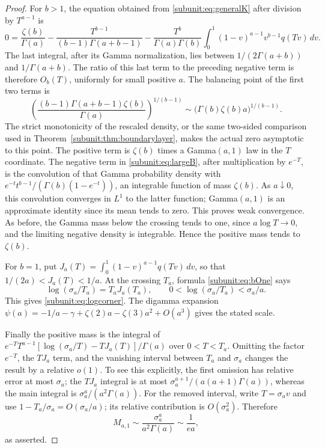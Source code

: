 \begin{proof}
For $b>1$, the equation obtained from
\eqref{subunit:eq:generalK} after division by $T^{a-1}$ is
\[
 0=\frac{\zeta(b)}{\Gamma(a)}
 -\frac{T^{b-1}}{(b-1)\Gamma(a+b-1)}
 -\frac{T^b}{\Gamma(a)\Gamma(b)}
       \int_0^1(1-v)^{a-1}v^{b-1}q(Tv)\,dv.
\]
The last integral, after its Gamma normalization, lies between
$1/(2\Gamma(a+b))$ and $1/\Gamma(a+b)$. The ratio of this
last term to the preceding negative term is therefore $O_b(T)$,
uniformly for small positive $a$. The balancing point of the first
two terms is
\[
 \left(\frac{(b-1)\Gamma(a+b-1)\zeta(b)}{\Gamma(a)}\right)^{1/(b-1)}
 \sim\bigl(\Gamma(b)\zeta(b)a\bigr)^{1/(b-1)}.
\]
The strict monotonicity of the rescaled density, or the same two-sided
comparison used in Theorem~\ref{subunit:thm:boundarylayer}, makes the
actual zero asymptotic to this point. The positive term is $\zeta(b)$
times a Gamma$(a,1)$ law in the $T$ coordinate. The negative term in
\eqref{subunit:eq:largeB}, after multiplication by $e^{-T}$, is the
convolution of that Gamma probability density with
$e^{-t}t^{b-1}/(\Gamma(b)(1-e^{-t}))$, an integrable function of mass
$\zeta(b)$. As $a\downarrow0$, this convolution converges in $L^1$
to the latter function; Gamma$(a,1)$ is an approximate identity since
its mean tends to zero. This proves weak convergence. As before,
the Gamma mass below the crossing tends to one, since $a\log T\to0$,
and the limiting negative density is integrable. Hence the positive
mass tends to $\zeta(b)$.

For $b=1$, put
$J_a(T)=\int_0^1(1-v)^{a-1}q(Tv)\,dv$, so that
$1/(2a)<J_a(T)<1/a$. At the crossing $T_a$, formula
\eqref{subunit:eq:bOne} says
\[
 \log(\sigma_a/T_a)=T_aJ_a(T_a),\qquad
 0<\log(\sigma_a/T_a)<\sigma_a/a.
\]
This gives \eqref{subunit:eq:logcorner}. The digamma expansion
$\psi(a)=-1/a-\gamma+\zeta(2)a-\zeta(3)a^2+O(a^3)$ gives
the stated scale.

Finally the positive mass is the integral of
$e^{-T}T^{a-1}[\log(\sigma_a/T)-T J_a(T)]/\Gamma(a)$
over $0<T<T_a$. Omitting the factor $e^{-T}$, the $TJ_a$ term,
and the vanishing interval between $T_a$ and $\sigma_a$ changes
the result by a relative $o(1)$. To see this explicitly, the first
omission has relative error at most $\sigma_a$; the $TJ_a$ integral
is at most $\sigma_a^{a+1}/(a(a+1)\Gamma(a))$, whereas the main
integral is $\sigma_a^a/(a^2\Gamma(a))$. For the removed interval,
write $T=\sigma_a v$ and use
$1-T_a/\sigma_a=O(\sigma_a/a)$; its relative contribution is
$O(\sigma_a^2)$. Therefore
\[
 M_{a,1}\sim\frac{\sigma_a^a}{a^2\Gamma(a)}
 \sim\frac1{ea},
\]
as asserted.
\end{proof}
